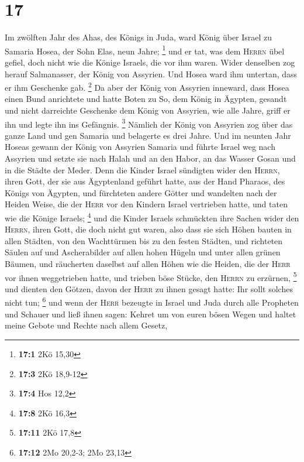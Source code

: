\hypertarget{section-5}{%
\section{17}\label{section-5}}

 Im zwölften Jahr des Ahas, des Königs in Juda, ward König
über Israel zu Samaria Hosea, der Sohn Elas, neun Jahre; \footnote{\textbf{17:1}
  2Kö 15,30}  und er tat, was dem \textsc{Herrn} übel
gefiel, doch nicht wie die Könige Israels, die vor ihm waren.
 Wider denselben zog herauf Salmanasser, der König von
Assyrien. Und Hosea ward ihm untertan, dass er ihm Geschenke gab.
\footnote{\textbf{17:3} 2Kö 18,9-12}  Da aber der König
von Assyrien inneward, dass Hosea einen Bund anrichtete und hatte Boten
zu So, dem König in Ägypten, gesandt und nicht darreichte Geschenke dem
König von Assyrien, wie alle Jahre, griff er ihn und legte ihn ins
Gefängnis. \footnote{\textbf{17:4} Hos 12,2}  Nämlich der
König von Assyrien zog über das ganze Land und gen Samaria und belagerte
es drei Jahre.  Und im neunten Jahr Hoseas gewann der
König von Assyrien Samaria und führte Israel weg nach Assyrien und
setzte sie nach Halah und an den Habor, an das Wasser Gosan und in die
Städte der Meder.  Denn die Kinder Israel sündigten wider
den \textsc{Herrn}, ihren Gott, der sie aus Ägyptenland geführt hatte,
aus der Hand Pharaos, des Königs von Ägypten, und fürchteten andere
Götter  und wandelten nach der Heiden Weise, die der
\textsc{Herr} vor den Kindern Israel vertrieben hatte, und taten wie die
Könige Israels; \footnote{\textbf{17:8} 2Kö 16,3}  und die
Kinder Israels schmückten ihre Sachen wider den \textsc{Herrn}, ihren
Gott, die doch nicht gut waren, also dass sie sich Höhen bauten in allen
Städten, von den Wachttürmen bis zu den festen Städten, 
und richteten Säulen auf und Ascherabilder auf allen hohen Hügeln und
unter allen grünen Bäumen,  und räucherten daselbst auf
allen Höhen wie die Heiden, die der \textsc{Herr} vor ihnen weggetrieben
hatte, und trieben böse Stücke, den \textsc{Herrn} zu erzürnen,
\footnote{\textbf{17:11} 2Kö 17,8}  und dienten den
Götzen, davon der \textsc{Herr} zu ihnen gesagt hatte: Ihr sollt solches
nicht tun; \footnote{\textbf{17:12} 2Mo 20,2-3; 2Mo 23,13}
 und wenn der \textsc{Herr} bezeugte in Israel und Juda
durch alle Propheten und Schauer und ließ ihnen sagen: Kehret um von
euren bösen Wegen und haltet meine Gebote und Rechte nach allem Gesetz,
